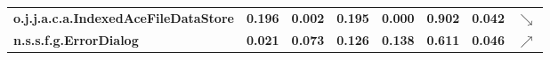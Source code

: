 \begin{tabular}{llllllll}
\multicolumn{1}{l|}{\textbf{o.j.j.a.c.a.IndexedAceFileDataStore}}           & \textbf{0.196} & \multicolumn{1}{l|}{\textbf{0.002}} & \textbf{0.195} & \multicolumn{1}{l|}{\textbf{0.000}} & \textbf{0.902} & \textbf{0.042} & $\searrow$\\
\multicolumn{1}{l|}{\textbf{n.s.s.f.g.ErrorDialog}}                         & \textbf{0.021} & \multicolumn{1}{l|}{\textbf{0.073}} & \textbf{0.126} & \multicolumn{1}{l|}{\textbf{0.138}} & \textbf{0.611} & \textbf{0.046} & $\nearrow$\\\end{tabular}